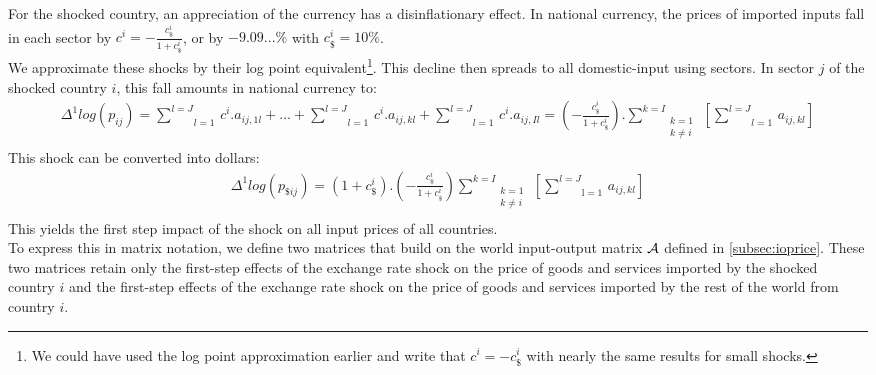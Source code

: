 \documentclass[11pt,a4paper]{article}
\begin{document}
For the shocked country, an appreciation of the currency has a disinflationary effect. In national currency, the prices of imported inputs fall in each sector by $c^i=-\frac{c_\$^i}{1+{c_\$^i}}$, or by $-9.09...\%$ with $c_\$^i=10\%$.\\
We approximate these shocks by their log point equivalent\footnote{We could have used the log point approximation earlier and write that $c^i=-c_\$^i$ with nearly the same results for small shocks.}.
This decline then spreads to all domestic-input using sectors. In sector $j$ of the shocked country $i$, this fall amounts in national currency to: \\
\begin{eqnarray*}
\Delta^1log(p_{ij})=\underset{l=1}{\overset{l=J}{\mathop \sum}}\,c^i.a_{ij,1l}+\ldots +\underset{l=1}{\overset{{l}=J}{\mathop \sum }}\,c^i.a_{ij,kl}+\underset{l=1}{\overset{l={J}}{\mathop \sum }}\,c^i.{{a}_{ij,Il}}=\left( -\frac{c_\$^i}{1+c_\$^i}\right).\underset{\begin{matrix}k=1\\k\neq i\\\end{matrix}}{\overset{k=I}{\mathop\sum}}\,\left[\underset{l=1}{\overset{l=J}{\mathop\sum}}\,a_{ij,kl}\right] 
\end{eqnarray*}
This shock can be converted into dollars: \\
\begin{eqnarray}
\Delta^1 log(p_{\$ij})=\left(1+c_\$^i\right).\left(-\frac{c_\$^i}{1+c_\$^i}\right)\underset{\begin{matrix}k=1\\k\neq i\\\end{matrix}}{\overset{{k}={I}}{\mathop\sum}}\,\left[\underset{\text{l}=1}{\overset{{l}={J}}{\mathop\sum}}\,{{{a}}_{ij,kl}}\right] 
\label{eq:eq2}
\end{eqnarray}
This yields the first step impact of the shock on all input prices of all countries.\\
To express this in matrix notation, we define two matrices that build on the world input-output matrix $\cal A$ defined in \ref{subsec:ioprice}. 
These two matrices retain only the first-step effects of the exchange rate shock on the price of goods and services imported by the shocked country $i$ and the first-step effects of the exchange rate shock on the price of goods and services imported by the rest of the world from country $i$. 
\end{document}
